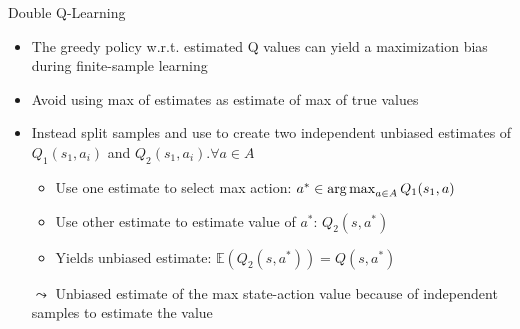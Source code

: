 \documentclass[aspectratio=169]{../latex_main/tntbeamer}  %
\begin{document}
\begin{frame}[c]{Double Q-Learning}	
	
	\begin{itemize}
		\item The greedy policy w.r.t. estimated Q values can yield a maximization
		bias during finite-sample learning
		\item Avoid using max of estimates as estimate of max of true values
		\item Instead split samples and use to create two independent unbiased
		estimates of $Q_1(s_1, a_i)$ and $Q_2(s_1, a_i). \forall a\in A$
		\begin{itemize}
			\item Use one estimate to select max action: $a^* \in \operatorname*{arg\,max}_{a \in A} Q_1(s_1, a)$
			\item Use other estimate to estimate value of $a^*$: $Q_2(s,a^*)$
			\item Yields unbiased estimate: $\mathbb{E}(Q_2(s,a^*)) = Q(s,a^*)$
		\end{itemize}
		\item[$\leadsto$] Unbiased estimate of the max state-action value because of independent samples to estimate the value
	\end{itemize}

	
\end{frame}
\end{document}
